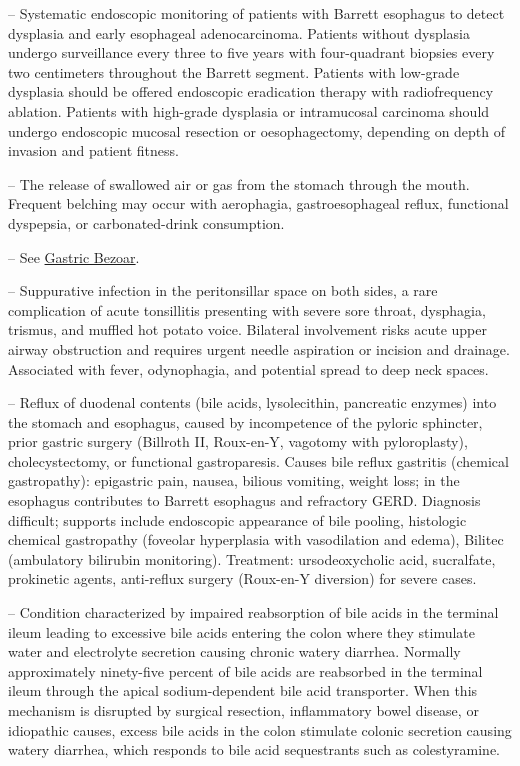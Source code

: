-- Systematic endoscopic monitoring of patients with Barrett esophagus to detect dysplasia and early esophageal adenocarcinoma. Patients without dysplasia undergo surveillance every three to five years with four-quadrant biopsies every two centimeters throughout the Barrett segment. Patients with low-grade dysplasia should be offered endoscopic eradication therapy with radiofrequency ablation. Patients with high-grade dysplasia or intramucosal carcinoma should undergo endoscopic mucosal resection or oesophagectomy, depending on depth of invasion and patient fitness.

-- The release of swallowed air or gas from the stomach through the mouth. Frequent belching may occur with aerophagia, gastroesophageal reflux, functional dyspepsia, or carbonated-drink consumption.

-- See \hyperlink{Gastric Bezoar}{Gastric Bezoar}.

-- Suppurative infection in the peritonsillar space on both sides, a rare complication of acute tonsillitis presenting with severe sore throat, dysphagia, trismus, and muffled hot potato voice. Bilateral involvement risks acute upper airway obstruction and requires urgent needle aspiration or incision and drainage. Associated with fever, odynophagia, and potential spread to deep neck spaces.

-- Reflux of duodenal contents (bile acids, lysolecithin, pancreatic enzymes) into the stomach and esophagus, caused by incompetence of the pyloric sphincter, prior gastric surgery (Billroth II, Roux-en-Y, vagotomy with pyloroplasty), cholecystectomy, or functional gastroparesis. Causes bile reflux gastritis (chemical gastropathy): epigastric pain, nausea, bilious vomiting, weight loss; in the esophagus contributes to Barrett esophagus and refractory GERD. Diagnosis difficult; supports include endoscopic appearance of bile pooling, histologic chemical gastropathy (foveolar hyperplasia with vasodilation and edema), Bilitec (ambulatory bilirubin monitoring). Treatment: ursodeoxycholic acid, sucralfate, prokinetic agents, anti-reflux surgery (Roux-en-Y diversion) for severe cases.

-- Condition characterized by impaired reabsorption of bile acids in the terminal ileum leading to excessive bile acids entering the colon where they stimulate water and electrolyte secretion causing chronic watery diarrhea. Normally approximately ninety-five percent of bile acids are reabsorbed in the terminal ileum through the apical sodium-dependent bile acid transporter. When this mechanism is disrupted by surgical resection, inflammatory bowel disease, or idiopathic causes, excess bile acids in the colon stimulate colonic secretion causing watery diarrhea, which responds to bile acid sequestrants such as colestyramine.

